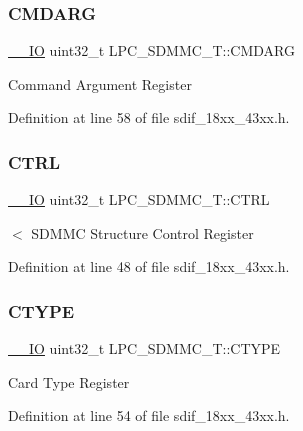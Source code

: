 \subsubsection{\texorpdfstring{C\+M\+D\+A\+RG}{CMDARG}}
{\footnotesize\ttfamily \hyperlink{core__sc300_8h_aec43007d9998a0a0e01faede4133d6be}{\+\_\+\+\_\+\+IO} uint32\+\_\+t L\+P\+C\+\_\+\+S\+D\+M\+M\+C\+\_\+\+T\+::\+C\+M\+D\+A\+RG}

Command Argument Register 

Definition at line 58 of file sdif\+\_\+18xx\+\_\+43xx.\+h.

\mbox{\label{struct_l_p_c___s_d_m_m_c___t_a2fbfe51e11aa29e544779fde6ed3efcc}} 
\subsubsection{\texorpdfstring{C\+T\+RL}{CTRL}}
{\footnotesize\ttfamily \hyperlink{core__sc300_8h_aec43007d9998a0a0e01faede4133d6be}{\+\_\+\+\_\+\+IO} uint32\+\_\+t L\+P\+C\+\_\+\+S\+D\+M\+M\+C\+\_\+\+T\+::\+C\+T\+RL}

$<$ S\+D\+M\+MC Structure Control Register 

Definition at line 48 of file sdif\+\_\+18xx\+\_\+43xx.\+h.

\mbox{\label{struct_l_p_c___s_d_m_m_c___t_a90b46bdd4bcf06d7f722a35c07113346}} 
\subsubsection{\texorpdfstring{C\+T\+Y\+PE}{CTYPE}}
{\footnotesize\ttfamily \hyperlink{core__sc300_8h_aec43007d9998a0a0e01faede4133d6be}{\+\_\+\+\_\+\+IO} uint32\+\_\+t L\+P\+C\+\_\+\+S\+D\+M\+M\+C\+\_\+\+T\+::\+C\+T\+Y\+PE}

Card Type Register 

Definition at line 54 of file sdif\+\_\+18xx\+\_\+43xx.\+h.

\mbox{\label{struct_l_p_c___s_d_m_m_c___t_a674862ec48e5b392ff81b620fda3da62}} 
